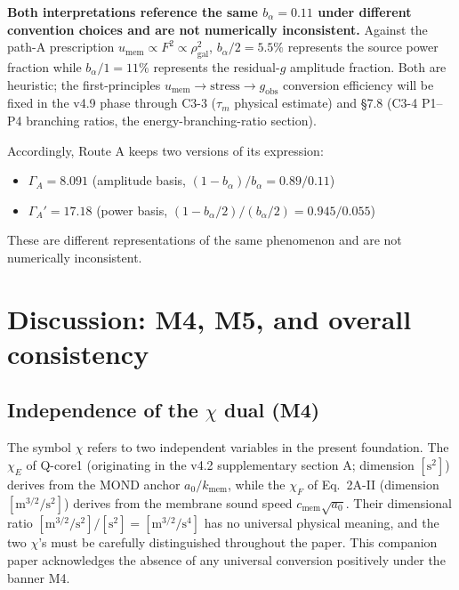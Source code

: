 \documentclass[11pt,a4paper]{article}
\newcommand{\kmem}{k_{\mathrm{mem}}}
\newcommand{\cmem}{c_{\mathrm{mem}}}
\newcommand{\taum}{\tau_{m}}
\newcommand{\bal}{b_{\alpha}}
\newcommand{\umem}{u_{\mathrm{mem}}}
\newcommand{\rhogal}{\rho_{\mathrm{gal}}}
\newcommand{\GammaA}{\Gamma_{A}}
\newcommand{\GammaAp}{\Gamma_{A}'}
\newcommand{\gobs}{g_{\mathrm{obs}}}
\begin{document}
\begin{notebox}
\textbf{Both interpretations reference the same $\bal = 0.11$ under different convention choices
and are not numerically inconsistent.}
Against the path-A prescription $\umem \propto F^2 \propto \rhogal^2$,
$\bal/2 = 5.5\%$ represents the source power fraction while
$\bal/1 = 11\%$ represents the residual-$g$ amplitude fraction. Both are heuristic; the
first-principles $\umem \to \text{stress} \to \gobs$ conversion efficiency will be fixed in the v4.9
phase through C3-3 ($\taum$ physical estimate) and \S 7.8 (C3-4 P1--P4 branching ratios, the
energy-branching-ratio section).
\end{notebox}

Accordingly, Route A keeps two versions of its expression:
\begin{itemize}[leftmargin=*,itemsep=2pt]
\item $\GammaA = 8.091$ (amplitude basis, $(1 - \bal)/\bal = 0.89/0.11$)
\item $\GammaAp = 17.18$ (power basis, $(1 - \bal/2)/(\bal/2) = 0.945/0.055$)
\end{itemize}
These are different representations of the same phenomenon and are not numerically inconsistent.


\section{Discussion: M4, M5, and overall consistency}

\subsection{Independence of the $\chi$ dual (M4)}
The symbol $\chi$ refers to two independent variables in the present foundation. The $\chi_E$ of
Q-core1 (originating in the v4.2 supplementary section A; dimension $[\mathrm{s}^2]$) derives from
the MOND anchor $a_0 / \kmem$, while the $\chi_F$ of Eq.~2A-II (dimension
$[\mathrm{m}^{3/2}/\mathrm{s}^2]$) derives from the membrane sound speed $\cmem \sqrt{a_0}$. Their
dimensional ratio
$[\mathrm{m}^{3/2}/\mathrm{s}^2]/[\mathrm{s}^2] = [\mathrm{m}^{3/2}/\mathrm{s}^4]$
has no universal physical meaning, and the two $\chi$'s must be carefully distinguished throughout
the paper. This companion paper acknowledges the absence of any universal conversion positively
under the banner M4.
\end{document}
